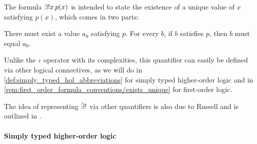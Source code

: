 \begin{concept}
\begin{thmenum}
    The formula \( \qExists* x p(x) \) is intended to state the existence of a unique value of \( x \) satisfying \( p(x) \), which comes in two parts:
    \begin{thmenum}
       There must exist a value \( a_0 \) satisfying \( p \).
       For every \( b \), if \( b \) satisfies \( p \), then \( b \) must equal \( a_0 \).
    \end{thmenum}

    Unlike the \( \rotiota \) operator with its complexities, this quantifier can easily be defined via other logical connectives, as we will do in \cref{def:simply_typed_hol_abbreviations} for simply typed higher-order logic and in \cref{rem:first_order_formula_conventions/exists_unique} for first-order logic.
  \end{thmenum}
\end{concept}
\begin{comments}
  \item The idea of representing \( \mathord{\dot{\exists} !} \) via other quantifiers is also due to Russell and is outlined in \cite{Russell1905OnDenoting}.
\end{comments}

\paragraph{Simply typed higher-order logic}

